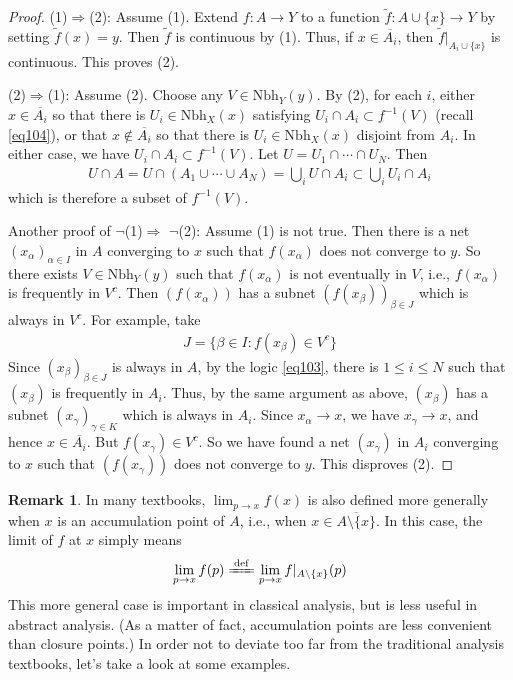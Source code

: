 \documentclass[12pt,b5paper,notitlepage]{article}
\theoremstyle{definition}
\newtheorem{rem}[df]{Remark}
\theoremstyle{plain}
\newcommand{\wtd}{\widetilde}
\newcommand{\ovl}{\overline}
\newcommand{\Nbh}{\mathrm{Nbh}}
\numberwithin{equation}{section}
\begin{document}
\begin{proof}
(1)$\Rightarrow$(2): Assume (1). Extend $f:A\rightarrow Y$ to a function $\wtd f:A\cup\{x\}\rightarrow Y$ by setting $\wtd f(x)=y$. Then $\wtd f$ is continuous by (1). Thus, if $x\in\ovl{A_i}$, then $\wtd f|_{A_i\cup\{x\}}$ is continuous. This proves (2).

(2)$\Rightarrow$(1): Assume (2). Choose any $V\in\Nbh_Y(y)$. By (2), for each $i$, either $x\in\ovl{A_i}$ so that there is $U_i\in\Nbh_X(x)$ satisfying $U_i\cap A_i\subset f^{-1}(V)$ (recall \eqref{eq104}), or that $x\notin\ovl{A_i}$ so that there is $U_i\in\Nbh_X(x)$ disjoint from $A_i$. In either case, we have $U_i\cap A_i\subset f^{-1}(V)$. Let $U=U_1\cap\cdots\cap U_N$. Then
\begin{align*}
U\cap A=U\cap(A_1\cup\cdots\cup A_N)=\bigcup_i U\cap A_i\subset\bigcup_i U_i\cap A_i
\end{align*}
which is therefore a subset of $f^{-1}(V)$.

Another proof of $\neg$(1)$\Rightarrow$ $\neg$(2): Assume (1) is not true. Then there is a net $(x_\alpha)_{\alpha\in I}$ in $A$ converging to $x$ such that $f(x_\alpha)$ does not converge to $y$. So there exists $V\in\Nbh_Y(y)$ such that $f(x_\alpha)$ is not eventually in $V$, i.e., $f(x_\alpha)$ is frequently in $V^c$. Then $(f(x_\alpha))$ has a subnet $(f(x_{\beta}))_{\beta\in J}$ which is always in $V^c$. For example, take
\begin{align*}
J=\{\beta\in I:f(x_\beta)\in V^c\}
\end{align*}
Since $(x_\beta)_{\beta\in J}$ is always in $A$, by the logic \eqref{eq103}, there is $1\leq i\leq N$ such that $(x_\beta)$ is frequently in $A_i$. Thus, by the same argument as above, $(x_\beta)$ has a subnet $(x_\gamma)_{\gamma\in K}$ which is always in $A_i$. Since $x_\alpha\rightarrow x$, we have $x_\gamma\rightarrow x$, and hence $x\in\ovl{A_i}$. But $f(x_\gamma)\in V^c$. So we have found a net $(x_\gamma)$ in $A_i$ converging to $x$ such that $(f(x_\gamma))$ does not converge to $y$. This disproves (2).
\end{proof}








\begin{rem}
In many textbooks, $\lim_{p\rightarrow x}f(x)$ is also defined more generally when $x$ is an accumulation point of $A$, i.e., when $x\in\ovl{A\setminus\{x\}}$. In this case, the limit of $f$ at $x$ simply means 
\begin{align}\label{eq66}
\lim_{p\rightarrow x}f(p)
\xlongequal{\mathrm{def}} \lim_{p\rightarrow x}f|_{A\setminus\{x\}}(p)
\end{align}
This more general case is important in classical analysis, but is less useful in abstract analysis. (As a matter of fact, accumulation points are less convenient than closure points.) In order not to deviate too far from the traditional analysis textbooks, let's take a look at some examples.
\end{rem}
\end{document}
